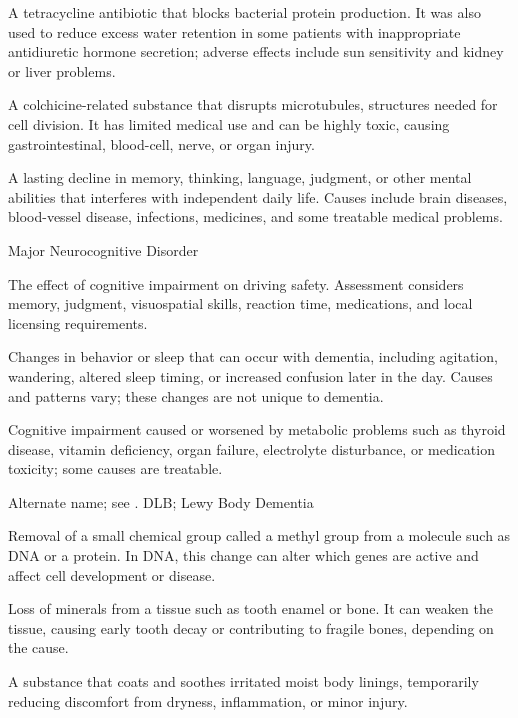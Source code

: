  A tetracycline antibiotic that blocks bacterial protein production. It was also used to reduce excess water retention in some patients with inappropriate antidiuretic hormone secretion; adverse effects include sun sensitivity and kidney or liver problems.

 A colchicine-related substance that disrupts microtubules, structures needed for cell division. It has limited medical use and can be highly toxic, causing gastrointestinal, blood-cell, nerve, or organ injury.

 A lasting decline in memory, thinking, language, judgment, or other mental abilities that interferes with independent daily life. Causes include brain diseases, blood-vessel disease, infections, medicines, and some treatable medical problems.

\synonyms
Major Neurocognitive Disorder

 The effect of cognitive impairment on driving safety. Assessment considers memory, judgment, visuospatial skills, reaction time, medications, and local licensing requirements.

 Changes in behavior or sleep that can occur with dementia, including agitation, wandering, altered sleep timing, or increased confusion later in the day. Causes and patterns vary; these changes are not unique to dementia.

 Cognitive impairment caused or worsened by metabolic problems such as thyroid disease, vitamin deficiency, organ failure, electrolyte disturbance, or medication toxicity; some causes are treatable.

 Alternate name; see .
\synonyms
DLB; Lewy Body Dementia


 Removal of a small chemical group called a methyl group from a molecule such as DNA or a protein. In DNA, this change can alter which genes are active and affect cell development or disease.

 Loss of minerals from a tissue such as tooth enamel or bone. It can weaken the tissue, causing early tooth decay or contributing to fragile bones, depending on the cause.

 A substance that coats and soothes irritated moist body linings, temporarily reducing discomfort from dryness, inflammation, or minor injury.

